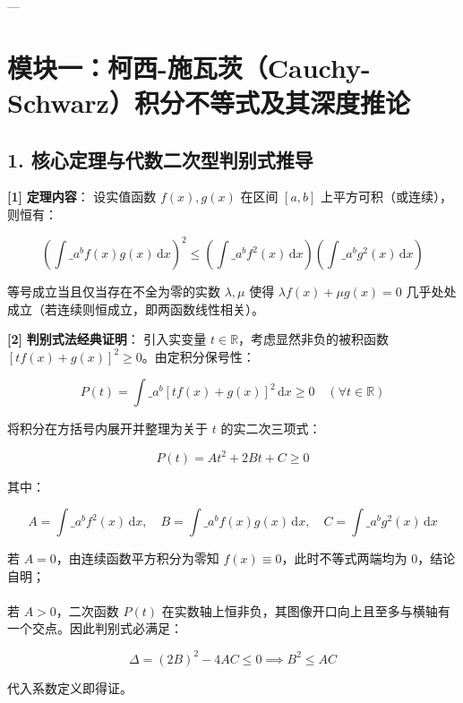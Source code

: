 \documentclass[11pt,a4paper,UTF8]{ctexart}
\begin{document}
\pagestyle{fancy}
\fancyhf{}
\fancyhead[R]{\small\color{TitlePurple}\nouppercase{\leftmark}}
\renewcommand{\headrulewidth}{0.5pt}

\tableofcontents
\newpage
{}


---


\section{模块一：柯西-施瓦茨（Cauchy-Schwarz）积分不等式及其深度推论}


\subsection{1. 核心定理与代数二次型判别式推导}
\begin{solbox}[分步推导与答题规范]
\textbf{[1]}  \textbf{定理内容}：
设实值函数 $f(x), g(x)$ 在区间 $[a, b]$ 上平方可积（或连续），则恒有：

\begin{equation*}
\left( \int\_a^b f(x)g(x)\,\mathrm{d}x \right)^2 \le \left( \int\_a^b f^2(x)\,\mathrm{d}x \right) \left( \int\_a^b g^2(x)\,\mathrm{d}x \right)
\end{equation*}

等号成立当且仅当存在不全为零的实数 $\lambda, \mu$ 使得 $\lambda f(x) + \mu g(x) = 0$ 几乎处处成立（若连续则恒成立，即两函数线性相关）。

\textbf{[2]}  \textbf{判别式法经典证明}：
引入实变量 $t \in \mathbb{R}$，考虑显然非负的被积函数 $[t f(x) + g(x)]^2 \ge 0$。由定积分保号性：

\begin{equation*}
P(t) = \int\_a^b [t f(x) + g(x)]^2\,\mathrm{d}x \ge 0 \quad (\forall t \in \mathbb{R})
\end{equation*}

将积分在方括号内展开并整理为关于 $t$ 的实二次三项式：

\begin{equation*}
P(t) = A t^2 + 2 B t + C \ge 0
\end{equation*}

其中：

\begin{equation*}
A = \int\_a^b f^2(x)\,\mathrm{d}x,\quad B = \int\_a^b f(x)g(x)\,\mathrm{d}x,\quad C = \int\_a^b g^2(x)\,\mathrm{d}x
\end{equation*}

若 $A = 0$，由连续函数平方积分为零知 $f(x) \equiv 0$，此时不等式两端均为 $0$，结论自明；\\ \\
若 $A > 0$，二次函数 $P(t)$ 在实数轴上恒非负，其图像开口向上且至多与横轴有一个交点。因此判别式必满足：

\begin{equation*}
\Delta = (2B)^2 - 4AC \le 0 \implies B^2 \le AC
\end{equation*}

代入系数定义即得证。
\end{solbox}
\end{document}
